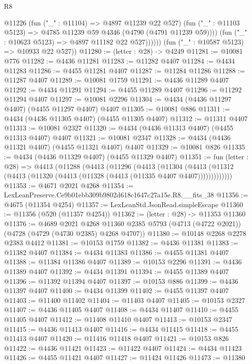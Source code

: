 \begin{lexlean}{R8}
\begin{coremodule}
                @11226
                  (fun ("_" : @11104) => @4897 @11239 @22 @527)
                  (fun ("_" : @11103 @5123) => @4785 @11239 @59 @4346 (@4790 (@4791 @11239 @59))))
                (fun ("_" : @10623 @5123) => @4897 @11182 @22 @527))))))
      (fun ("_" : @10587 @5123) => @10933 @22 @527))
@11280 := (letter : @28) -> @4249
@11281 := @10081 @776
@11282 := @4436 @11281
@11283 := @11282 @4407
@11284 := @4434 @11283
@11286 := @4455 @11281 @4407
@11287 := @11284 @11286
@11288 := @11287 @4407
@11289 := @10081 @1759
@11291 := @4436 @11289 @4407
@11292 := @4434 @11291
@11294 := @4455 @11289 @4407
@11296 := @11292 @11294 @4407
@11297 := @10081 @2296
@11304 := @4434 (@4436 @11297 @4407) (@4455 @11297 @4407) @4407
@11305 := @10081 @886
@11311 := @4434 (@4436 @11305 @4407) (@4455 @11305 @4407)
@11312 := @11311 @4407
@11313 := @10081 @2327
@11320 := @4434 (@4436 @11313 @4407) (@4455 @11313 @4407) @4407
@11321 := @10081 @2347
@11328 := @4434 (@4436 @11321 @4407) (@4455 @11321 @4407) @4407
@11329 := @10081 @826
@11335 := @4434 (@4436 @11329 @4407) (@4455 @11329 @4407)
@11351 := fun (letter : @28) =>
  @4413
    (@11288
      (@4413
        (@11296
          (@4413
            (@11304
              (@4413 (@11312 (@4413 (@11320 (@4413 (@11328 (@4413 (@11335 @4407 @4407)))))))))))))
@11353 := @4671 @2021 @4268
@11354 := LexLeanPreserve.Ce9b01ebb309b9802d618c1647c27a15e.R8.__fits_38
@11356 := @4675 (@11354 @4254)
@11357 := LexLeanStd.JsonRead.simpleEscape
@11360 := @11356 (@520 (@11357 @4254))
@11362 := (letter : @28) -> @11353 @11360
@11376 := @4689
    @2021
    @4268
    @11360
    @2385
    @5793
    (@4713 (@4722 @2021))
    (@4728 (@4729 (@4730 @2385) @4268 @4707))
@11380 := @10148 @2268 @2278 @2383 @4412
@11381 := @10153 @1759
@11382 := @4436 @11381
@11383 := @11382 @4407
@11384 := @4434 @11383
@11386 := @4455 @11381 @4407
@11388 := @11384 @11386 @4407
@11389 := @10153 @2296
@11391 := @4436 @11389 @4407
@11392 := @4434 @11391
@11394 := @4455 @11389 @4407
@11396 := @11392 @11394 @4407
@11397 := @10153 @886
@11399 := @4436 @11397 @4407
@11400 := @4434 @11399
@11402 := @4455 @11397 @4407
@11403 := @11400 @11402
@11404 := @11403 @4407
@11405 := @10153 @2327
@11407 := @4436 @11405 @4407
@11408 := @4434 @11407
@11410 := @4455 @11405 @4407
@11412 := @11408 @11410 @4407
@11413 := @10153 @2347
@11415 := @4436 @11413 @4407
@11416 := @4434 @11415
@11418 := @4455 @11413 @4407
@11420 := @11416 @11418 @4407
@11421 := @10153 @826
@11422 := @4436 @11421
@11423 := @11422 @4407
@11424 := @4434 @11423
@11426 := @4455 @11421 @4407
@11427 := @11424 @11426
@11473 := @11380

\end{coremodule}
\end{lexlean}
